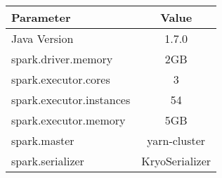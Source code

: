 %
%
%
\begin{table} [h]
\centering
\begin{tabular}{|l|c|}
\hline 
Parameter & Value  \\ 
\hline 
Java Version & 1.7.0 \\ 
\hline 
spark.driver.memory & 2GB \\ 
\hline 
spark.executor.cores & 3  \\ 
\hline 
spark.executor.instances & 54 \\ 
\hline 
spark.executor.memory & 5GB \\ 
\hline 
spark.master & yarn-cluster \\
\hline 
spark.serializer & KryoSerializer \\ 
\hline 
\end{tabular} 
\end{table}

